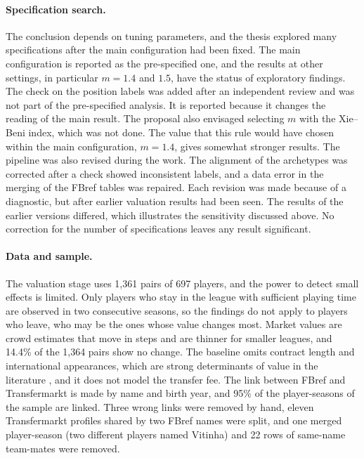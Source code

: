 \paragraph{Specification search.} The conclusion depends on tuning parameters, and the thesis explored many specifications after the main configuration had been fixed. The main configuration is reported as the pre-specified one, and the results at other settings, in particular $m=1.4$ and $1.5$, have the status of exploratory findings. The check on the position labels was added after an independent review and was not part of the pre-specified analysis. It is reported because it changes the reading of the main result. The proposal also envisaged selecting $m$ with the Xie--Beni index, which was not done. The value that this rule would have chosen within the main configuration, $m=1.4$, gives somewhat stronger results. The pipeline was also revised during the work. The alignment of the archetypes was corrected after a check showed inconsistent labels, and a data error in the merging of the FBref tables was repaired. Each revision was made because of a diagnostic, but after earlier valuation results had been seen. The results of the earlier versions differed, which illustrates the sensitivity discussed above. No correction for the number of specifications leaves any result significant.

\paragraph{Data and sample.} The valuation stage uses 1,361 pairs of 697 players, and the power to detect small effects is limited. Only players who stay in the league with sufficient playing time are observed in two consecutive seasons, so the findings do not apply to players who leave, who may be the ones whose value changes most. Market values are crowd estimates that move in steps and are thinner for smaller leagues, and 14.4\% of the 1,364 pairs show no change. The baseline omits contract length and international appearances, which are strong determinants of value in the literature \cite{franceschi2024determinants,poli2024statistical}, and it does not model the transfer fee. The link between FBref and Transfermarkt is made by name and birth year, and 95\% of the player-seasons of the sample are linked. Three wrong links were removed by hand, eleven Transfermarkt profiles shared by two FBref names were split, and one merged player-season (two different players named Vitinha) and 22 rows of same-name team-mates were removed.

